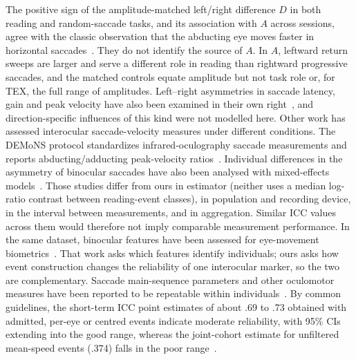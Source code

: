 The positive sign of the amplitude-matched left/right difference $D$ in both reading and random-saccade tasks, and its association with $A$ across sessions, agree with the classic observation that the abducting eye moves faster in horizontal saccades~\citep{collewijn1988}. They do not identify the source of $A$. In $A$, leftward return sweeps are larger and serve a different role in reading than rightward progressive saccades, and the matched controls equate amplitude but not task role or, for TEX, the full range of amplitudes. Left--right asymmetries in saccade latency, gain and peak velocity have also been examined in their own right~\citep{vergilino2012}, and direction-specific influences of this kind were not modelled here. Other work has assessed interocular saccade-velocity measures under different conditions. The DEMoNS protocol standardizes infrared-oculography saccade measurements and reports abducting/adducting peak-velocity ratios~\citep{nijbijvank2018}. Individual differences in the asymmetry of binocular saccades have also been analysed with mixed-effects models~\citep{kloke2006}. Those studies differ from ours in estimator (neither uses a median log-ratio contrast between reading-event classes), in population and recording device, in the interval between measurements, and in aggregation. Similar ICC values across them would therefore not imply comparable measurement performance. In the same dataset, binocular features have been assessed for eye-movement biometrics~\citep{yao2026}. That work asks which features identify individuals; ours asks how event construction changes the reliability of one interocular marker, so the two are complementary. Saccade main-sequence parameters and other oculomotor measures have been reported to be repeatable within individuals~\citep{gibaldi2021,bargary2017}. By common guidelines, the short-term ICC point estimates of about .69 to .73 obtained with admitted, per-eye or centred events indicate moderate reliability, with 95\% CIs extending into the good range, whereas the joint-cohort estimate for unfiltered mean-speed events (.374) falls in the poor range~\citep{koo2016}.

